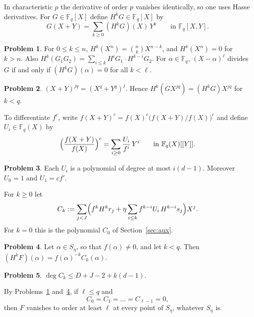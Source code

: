 \documentclass[reqno]{amsart}
\theoremstyle{definition}
\newtheorem{problem}{Problem}[section]
\theoremstyle{plain}
\newcommand{\F}{\mathbb{F}}
\begin{document}
In characteristic \(p\) the derivative of order \(p\) vanishes identically, so one uses Hasse derivatives.  For \(G \in \F_q[X]\) define \(H^k G \in \F_q[X]\) by
\[
  G(X + Y) = \sum_{k \ge 0} (H^k G)(X)\, Y^k \qquad \text{in } \F_q[X, Y] .
\]

\begin{problem}\label{pr:hasse}
For \(0 \le k \le n\), \(H^k(X^n) = \binom{n}{k} X^{n-k}\), and \(H^k(X^n) = 0\) for \(k > n\).  Also \(H^k(G_1 G_2) = \sum_{i \le k} H^i G_1 \cdot H^{k-i} G_2\).  For \(\alpha \in \F_q\), \((X - \alpha)^\ell\) divides \(G\) if and only if \((H^k G)(\alpha) = 0\) for all \(k < \ell\).
\end{problem}

\begin{problem}\label{pr:frobenius}
\((X + Y)^{jq} = (X^q + Y^q)^j\).  Hence \(H^k(G X^{jq}) = (H^k G) X^{jq}\) for \(k < q\).
\end{problem}

To differentiate \(f^c\), write \(f(X + Y)^c = f(X)^c \bigl( f(X+Y)/f(X) \bigr)^c\) and define \(U_i \in \F_q(X)\) by
\[
  \Bigl( \frac{f(X + Y)}{f(X)} \Bigr)^c = \sum_{i \ge 0} \frac{U_i}{f^i}\, Y^i \qquad \text{in } \F_q(X)[[Y]] .
\]

\begin{problem}\label{pr:Ui}
Each \(U_i\) is a polynomial of degree at most \(i(d-1)\).  Moreover \(U_0 = 1\) and \(U_1 = c f'\).
\end{problem}

For \(k \ge 0\) let
\begin{equation}\label{eq:Ck}
  C_k := \sum_{j<J} \Bigl( f^k H^k r_j + \eta \sum_{i \le k} f^{k-i} U_i\, H^{k-i} s_j \Bigr) X^j .
\end{equation}
For \(k = 0\) this is the polynomial \(C_0\) of Section~\ref{sec:aux}.

\begin{problem}\label{pr:jet}
Let \(\alpha \in S_\eta\), so that \(f(\alpha) \ne 0\), and let \(k < q\).  Then \((H^k F)(\alpha) = f(\alpha)^{-k} C_k(\alpha)\).
\end{problem}

\begin{problem}\label{pr:degCk}
\(\deg C_k \le D + J - 2 + k(d-1)\).
\end{problem}

By Problems~\ref{pr:hasse} and~\ref{pr:jet}, if \(\ell \le q\) and
\begin{equation}\label{eq:conditions}
  C_0 = C_1 = \dots = C_{\ell-1} = 0 ,
\end{equation}
then \(F\) vanishes to order at least \(\ell\) at every point of \(S_\eta\), whatever \(S_\eta\) is.
\end{document}
